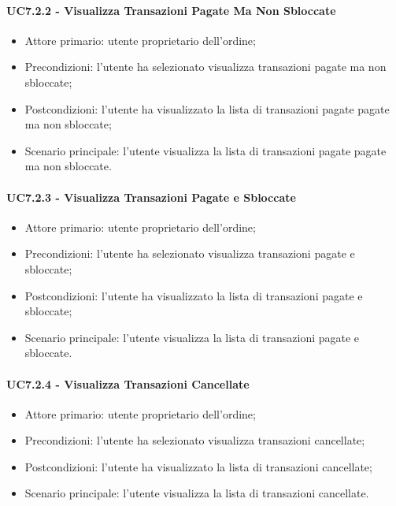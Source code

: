 \paragraph{UC7.2.2 - Visualizza Transazioni Pagate Ma Non Sbloccate}

\begin{itemize}
    \item Attore primario: utente proprietario dell'ordine;
    \item Precondizioni: l'utente ha selezionato visualizza transazioni pagate ma non sbloccate;
    \item Postcondizioni: l'utente ha visualizzato la lista di transazioni pagate pagate ma non sbloccate;
    \item Scenario principale: l'utente visualizza la lista di transazioni pagate pagate ma non sbloccate.
\end{itemize}

\paragraph{UC7.2.3 - Visualizza Transazioni Pagate e Sbloccate}

\begin{itemize}
    \item Attore primario: utente proprietario dell'ordine;
    \item Precondizioni: l'utente ha selezionato visualizza transazioni pagate e sbloccate;
    \item Postcondizioni: l'utente ha visualizzato la lista di transazioni pagate e sbloccate;
    \item Scenario principale: l'utente visualizza la lista di transazioni pagate e sbloccate.
\end{itemize}

\paragraph{UC7.2.4 - Visualizza Transazioni Cancellate}

\begin{itemize}
    \item Attore primario: utente proprietario dell'ordine;
    \item Precondizioni: l'utente ha selezionato visualizza transazioni cancellate;
    \item Postcondizioni: l'utente ha visualizzato la lista di transazioni cancellate;
    \item Scenario principale: l'utente visualizza la lista di transazioni cancellate.
\end{itemize}

